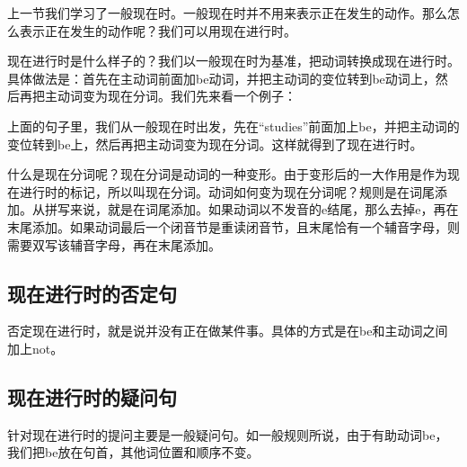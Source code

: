\documentclass[10.5pt, a4paper]{ctexbook} %
\begin{document}
上一节我们学习了一般现在时。一般现在时并不用来表示正在发生的动作。那么怎么表示正在发生的动作呢？我们可以用现在进行时。

现在进行时是什么样子的？我们以一般现在时为基准，把动词转换成现在进行时。具体做法是：首先在主动词前面加be动词，并把主动词的变位转到be动词上，然后再把主动词变为现在分词。我们先来看一个例子：

\vspace{8pt}
\begin{liju}
\end{liju}

上面的句子里，我们从一般现在时出发，先在“studies”前面加上be，并把主动词的变位转到be上，然后再把主动词变为现在分词。这样就得到了现在进行时。

什么是现在分词呢？现在分词是动词的一种变形。由于变形后的一大作用是作为现在进行时的标记，所以叫现在分词。动词如何变为现在分词呢？规则是在词尾添加。从拼写来说，就是在词尾添加。如果动词以不发音的e结尾，那么去掉e，再在末尾添加。如果动词最后一个闭音节是重读闭音节，且末尾恰有一个辅音字母，则需要双写该辅音字母，再在末尾添加。

\begin{liju}
\end{liju}

\subsection{现在进行时的否定句}

否定现在进行时，就是说并没有正在做某件事。具体的方式是在be和主动词之间加上not。
\begin{liju}
\end{liju}

\subsection{现在进行时的疑问句}
针对现在进行时的提问主要是一般疑问句。如一般规则所说，由于有助动词be，我们把be放在句首，其他词位置和顺序不变。
\end{document}
